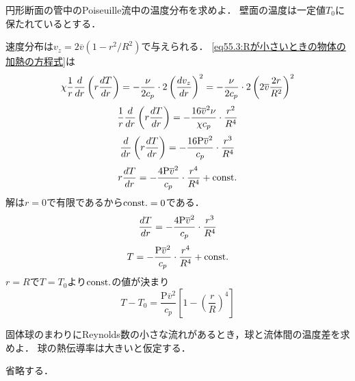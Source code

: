 \begin{mondai}{}{}
円形断面の管中のPoiseuille流中の温度分布を求めよ．
壁面の温度は一定値$T_0$に保たれているとする．
\end{mondai}
\begin{kaitou}
速度分布は$v_z = 2\overline{v} (1-r^2/R^2)$で与えられる．
\eqref{eq55.3:Rが小さいときの物体の加熱の方程式}は
\[
    \chi \frac{1}{r} \dv{r} \left( r \dv{T}{r} \right) 
    = -\frac{\nu}{2c_p} \cdot 2 \left( \dv{v_z}{r} \right)^2
    = -\frac{\nu}{2c_p} \cdot 2 \left( 2\overline{v} \frac{2r}{R^2} \right)^2
\]
\[
    \frac{1}{r} \dv{r} \left( r \dv{T}{r} \right) 
    = -\frac{16\overline{v}^2\nu}{\chi c_p} \cdot \frac{r^2}{R^4} 
\]
\[
    \dv{r} \left( r \dv{T}{r} \right) 
    = -\frac{16\mathrm{P}\overline{v}^2}{c_p} \cdot \frac{r^3}{R^4} 
\]
\[
    r \dv{T}{r}
    = -\frac{4\mathrm{P}\overline{v}^2}{c_p} \cdot \frac{r^4}{R^4} + \mathrm{const.}
\]
解は$r=0$で有限であるから$\mathrm{const.}=0$である．
\[
    \dv{T}{r}
    = -\frac{4\mathrm{P}\overline{v}^2}{c_p} \cdot \frac{r^3}{R^4}
\]
\[
    T = -\frac{\mathrm{P}\overline{v}^2}{c_p} \cdot \frac{r^4}{R^4} + \mathrm{const.}
\]
$r=R$で$T=T_0$より$\mathrm{const.}$の値が決まり
\[
    T - T_0 
    = \frac{\mathrm{P}\overline{v}^2}{c_p} \left[ 1 - \left( \frac{r}{R} \right)^4 \right]
\]



\end{kaitou}






\begin{mondai}{}{}
固体球のまわりにReynolds数の小さな流れがあるとき，球と流体間の温度差を求めよ．
球の熱伝導率は大きいと仮定する．
\end{mondai}
\begin{kaitou}
省略する．





\end{kaitou}


\BackToTheToc